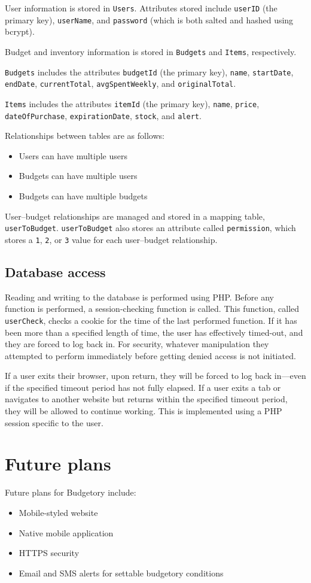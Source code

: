\documentclass{article}
\begin{document}
User information is stored in \texttt{Users}. Attributes stored include \texttt{userID} (the primary key), \texttt{userName}, and \texttt{password} (which is both salted and hashed using bcrypt).

Budget and inventory information is stored in \texttt{Budgets} and \texttt{Items}, respectively.

\texttt{Budgets} includes the attributes \texttt{budgetId} (the primary key), \texttt{name}, \texttt{startDate}, \texttt{endDate}, \texttt{currentTotal}, \texttt{avgSpentWeekly}, and \texttt{originalTotal}.

\texttt{Items} includes the attributes \texttt{itemId} (the primary key), \texttt{name}, \texttt{price}, \texttt{dateOfPurchase}, \texttt{expirationDate}, \texttt{stock}, and \texttt{alert}.

Relationships between tables are as follows:
\begin{itemize}[noitemsep, nolistsep]
\item Users can have multiple users
\item Budgets can have multiple users
\item Budgets can have multiple budgets
\end{itemize}

User--budget relationships are managed and stored in a mapping table, \texttt{userToBudget}. \texttt{userToBudget} also stores an attribute called \texttt{permission}, which stores a \texttt{1}, \texttt{2}, or \texttt{3} value for each user--budget relationship.

\vspace{20pt}
\subsection{Database access}
Reading and writing to the database is performed using PHP. Before any function is performed, a session-checking function is called. This function, called \texttt{userCheck}, checks a cookie for the time of the last performed function. If it has been more than a specified length of time, the user has effectively timed-out, and they are forced to log back in. For security, whatever manipulation they attempted to perform immediately before getting denied access is not initiated.

If a user exits their browser, upon return, they will be forced to log back in---even if the specified timeout period has not fully elapsed. If a user exits a tab or navigates to another website but  returns within the specified timeout period, they will be allowed to continue working. This is implemented using a PHP session specific to the user.

\vspace{40pt}
\section{Future plans}
Future plans for \textsf{Budgetory} include:
\begin{itemize}
\item Mobile-styled website
\item Native mobile application
\item HTTPS security
\item Email and SMS alerts for settable budgetory conditions
\end{itemize}
\end{document}

